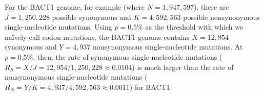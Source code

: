 For the BACT1 genome, for example
(where $N = 1,947,597$),
there are $J = 1,250,228$ possible synonymous and
$K = 4,592,563$ possible nonsynonymous single-nucleotide mutations.
%
Using $p = 0.5\%$ as the threshold with which we na\"ively call codon mutations,
the BACT1 genome contains
$X = 12,954$ synonymous and
$Y = 4,937$ nonsynonymous single-nucleotide mutations.
%
At $p = 0.5\%$, then, the rate of synonymous single-nucleotide mutations
($R_S = X / J = 12,954 / 1,250,228
\approx 0.0104$)
is much larger than the rate of nonsynonymous single-nucleotide mutations
($R_N = Y / K = 4,937 / 4,592,563
\approx 0.0011$)
for BACT1.
\endinput